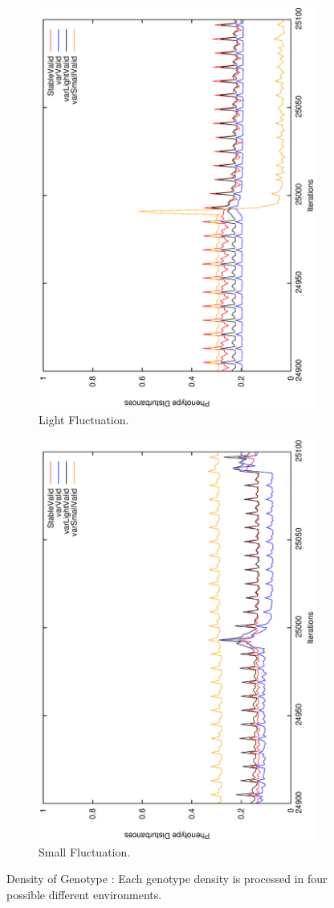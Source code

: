 \begin{figure}[H]
\begin{subfigure}{.25\textwidth}
  \centering
  \includegraphics[width=.7\linewidth, angle =-90]{img/avg499999variationLightb.eps}
  \caption{Light Fluctuation.}
  \label{fig:sfig2}
\end{subfigure}%
\begin{subfigure}{.25\textwidth}
  \centering
  \includegraphics[width=.7\linewidth, angle =-90]{img/avg499999variationSmallb.eps}
  \caption{Small Fluctuation.}
  \label{fig:sfig1}
\end{subfigure}
\caption{Density of Genotype : Each genotype density is processed in four possible different environments.}
\label{fig:density}
\end{figure}


